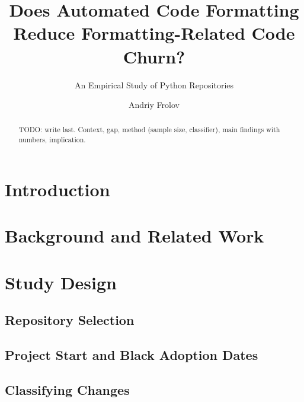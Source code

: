 \documentclass[acmsmall,nonacm,screen]{acmart}
\begin{document}
\title{Does Automated Code Formatting Reduce Formatting-Related Code Churn?}
\subtitle{An Empirical Study of Python Repositories}

\author{Andriy Frolov}

\begin{abstract}
TODO: write last. Context, gap, method (sample size, classifier), main findings with numbers, implication.
\end{abstract}


\maketitle

\section{Introduction}
\label{sec:intro}

\section{Background and Related Work}
\label{sec:related}

\section{Study Design}
\label{sec:design}
\subsection{Repository Selection}
\subsection{Project Start and Black Adoption Dates}
\subsection{Classifying Changes}
\end{document}
